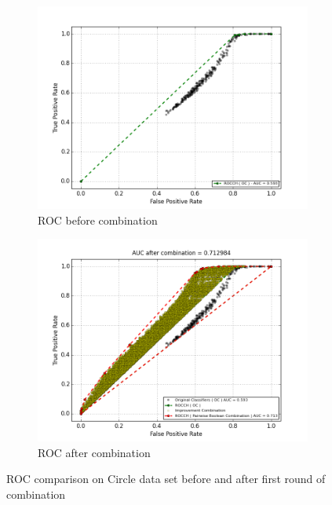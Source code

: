 \begin{figure}[H]
    \centering
    \begin{adjustbox}{minipage=\linewidth,scale=1.1}
    \begin{subfigure}[b]{0.5\columnwidth}
        \centering
        \includegraphics[width=\linewidth]{figs/ROCHLeft-Circle}
        \caption{ROC before combination}
        \label{fig:ROC_left_circle} 
    \end{subfigure}
    \begin{subfigure}[b]{0.5\columnwidth}
        \centering
        \includegraphics[width=\linewidth]{figs/ROCHRight-Circle}
        \caption{ROC after combination}
        \label{fig:ROC_right_circle}
    \end{subfigure}
    \caption{ROC comparison on Circle data set before and after first round of combination}
    \label{fig:ROC_comparison_circle}
    \end{adjustbox}
\end{figure}

